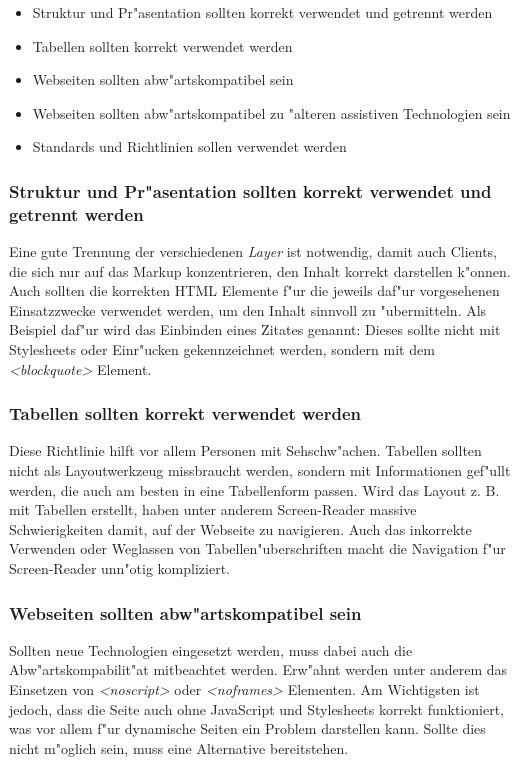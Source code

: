 \documentclass[a4paper,bibtotoc,oneside]{scrbook}
\begin{document}
\begin{itemize}
\item Struktur und Pr"asentation sollten korrekt verwendet und getrennt werden\cite[Abschnitt 6.3]{wcag1}
\item Tabellen sollten korrekt verwendet werden\cite[Abschnitt 6.5]{wcag1}
\item Webseiten sollten abw"artskompatibel sein\cite[Abschnitt 6.6]{wcag1}
\item Webseiten sollten abw"artskompatibel zu "alteren assistiven Technologien sein\cite[Abschnitt 6.10]{wcag1}
\item Standards und Richtlinien sollen verwendet werden\cite[Abschnitt 6.11]{wcag1}
\end{itemize}

\subsubsection{Struktur und Pr"asentation sollten korrekt verwendet und getrennt werden}
Eine gute Trennung der verschiedenen \emph{Layer} ist notwendig, damit auch Clients, die sich nur auf das Markup konzentrieren, den Inhalt korrekt darstellen k"onnen\cite[S. 42-43]{barr_webd}. Auch sollten die korrekten HTML Elemente f"ur die jeweils daf"ur vorgesehenen Einsatzzwecke verwendet werden, um den Inhalt sinnvoll zu "ubermitteln. Als Beispiel daf"ur wird das Einbinden eines Zitates genannt: Dieses sollte nicht mit Stylesheets oder Einr"ucken gekennzeichnet werden, sondern mit dem \emph{<blockquote>} Element. \cite[Abschnitt 6.3]{wcag1}

\subsubsection{Tabellen sollten korrekt verwendet werden}
Diese Richtlinie hilft vor allem Personen mit Sehschw"achen. Tabellen sollten nicht als Layoutwerkzeug missbraucht werden, sondern mit Informationen gef"ullt werden, die auch am besten in eine Tabellenform passen. Wird das Layout z. B. mit Tabellen erstellt, haben unter anderem Screen-Reader massive Schwierigkeiten damit, auf der Webseite zu navigieren. Auch das inkorrekte Verwenden oder Weglassen von Tabellen"uberschriften macht die Navigation f"ur Screen-Reader unn"otig kompliziert. \cite[Abschnitt 6.5]{wcag1}

\subsubsection{Webseiten sollten abw"artskompatibel sein}
Sollten neue Technologien eingesetzt werden, muss dabei auch die Abw"artskompabilit"at mitbeachtet werden. Erw"ahnt werden unter anderem das Einsetzen von \emph{<noscript>} oder \emph{<noframes>} Elementen. Am Wichtigsten ist jedoch, dass die Seite auch ohne JavaScript und Stylesheets korrekt funktioniert, was vor allem f"ur dynamische Seiten ein Problem darstellen kann. Sollte dies nicht m"oglich sein, muss eine Alternative bereitstehen. \cite[Abschnitt 6.6]{wcag1}
\end{document}

